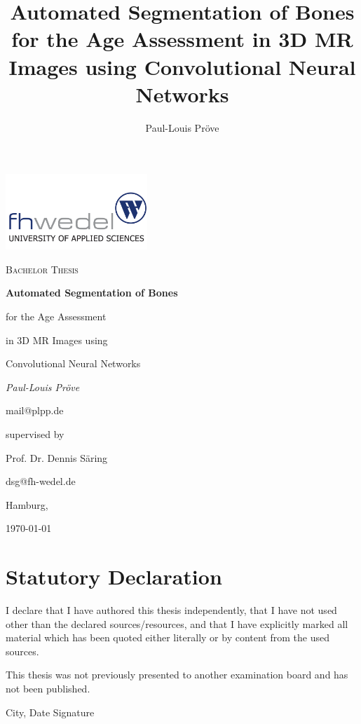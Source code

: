 \documentclass[11pt, a4paper]{article}
\title{Automated Segmentation of Bones for the Age Assessment in 3D MR Images using Convolutional Neural Networks}
\author{Paul-Louis Pröve}
\begin{document}
    \begin{titlepage}
    \centering
    \includegraphics[width=0.4\textwidth]{imgs/fhw.png}\par
    \vspace{1cm}
    {\scshape\Large Bachelor Thesis\par}
    \vspace{2cm}
    {\bfseries\huge Automated Segmentation of Bones \par for the Age Assessment \par in 3D MR Images using \par Convolutional Neural Networks\par}
    \vspace{2cm}
    {\itshape\Large Paul-Louis Pröve\par}
    mail@plpp.de\par
    \vfill
    supervised by\par
    Prof. Dr. Dennis Säring\par
    dsg@fh-wedel.de\par
    \vspace{1cm}
    Hamburg,\par \today\par
    \end{titlepage}



\tableofcontents
\newpage

\listoffigures
\listoftables
\newpage









\setcounter{page}{5}


\newpage

\section*{Statutory Declaration} 
\vspace{2cm}
I declare that I have authored this thesis independently, that I have not used other than the declared sources/resources, and that I have explicitly marked all material which has been quoted either literally or by content from the used sources.

This thesis was not previously presented to another examination board and has not been published.

\vspace{4cm}

\parbox{1.0\linewidth}{\dotfill}\par
\hspace{2cm} City, Date \hfill Signature \hspace{2cm}
\end{document}

